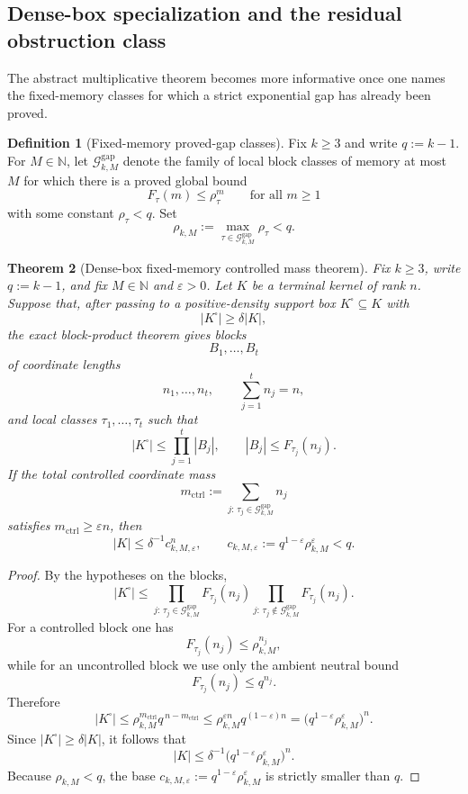 \documentclass[11pt]{article}
\newtheorem{theorem}{Theorem}[section]
\theoremstyle{definition}
\newtheorem{definition}[theorem]{Definition}
\newcommand{\eps}{\varepsilon}
\newcommand{\N}{\mathbb{N}}
\newcommand{\1}{\mathbf{1}}
\begin{document}
\subsection*{Dense-box specialization and the residual obstruction class}
The abstract multiplicative theorem becomes more informative once one names the fixed-memory classes for which a strict exponential gap has already been proved.

\begin{definition}[Fixed-memory proved-gap classes]\label{def:proved-gap-classes}
Fix $k\ge 3$ and write $q:=k-1$. For $M\in \N$, let $\mathcal G_{k,M}^{\mathrm{gap}}$ denote the family of local block classes of memory at most $M$ for which there is a proved global bound
\[
F_\tau(m)\le \rho_\tau^m
\qquad\text{for all }m\ge 1
\]
with some constant $\rho_\tau<q$. Set
\[
\rho_{k,M}:=\max_{\tau\in \mathcal G_{k,M}^{\mathrm{gap}}}\rho_\tau<q.
\]
\end{definition}

\begin{theorem}[Dense-box fixed-memory controlled mass theorem]\label{thm:dense-box-controlled-mass}
Fix $k\ge 3$, write $q:=k-1$, and fix $M\in \N$ and $\eps>0$. Let $K$ be a terminal kernel of rank $n$. Suppose that, after passing to a positive-density support box $K^\square\subseteq K$ with
\[
|K^\square|\ge \delta |K|,
\]
the exact block-product theorem gives blocks
\[
B_1,\dots,B_t
\]
of coordinate lengths
\[
n_1,\dots,n_t,
\qquad
\sum_{j=1}^t n_j=n,
\]
and local classes $\tau_1,\dots,\tau_t$ such that
\[
|K^\square|\le \prod_{j=1}^t |B_j|,
\qquad
|B_j|\le F_{\tau_j}(n_j).
\]
If the total controlled coordinate mass
\[
m_{\mathrm{ctrl}}:=\sum_{j:\,\tau_j\in \mathcal G_{k,M}^{\mathrm{gap}}} n_j
\]
satisfies $m_{\mathrm{ctrl}}\ge \eps n$, then
\[
|K|\le \delta^{-1} c_{k,M,\eps}^n,
\qquad
c_{k,M,\eps}:=q^{1-\eps}\rho_{k,M}^{\eps}<q.
\]
\end{theorem}

\begin{proof}
By the hypotheses on the blocks,
\[
|K^\square|
\le
\prod_{j:\,\tau_j\in \mathcal G_{k,M}^{\mathrm{gap}}} F_{\tau_j}(n_j)
\prod_{j:\,\tau_j\notin \mathcal G_{k,M}^{\mathrm{gap}}} F_{\tau_j}(n_j).
\]
For a controlled block one has
\[
F_{\tau_j}(n_j)\le \rho_{k,M}^{n_j},
\]
while for an uncontrolled block we use only the ambient neutral bound
\[
F_{\tau_j}(n_j)\le q^{n_j}.
\]
Therefore
\[
|K^\square|
\le
\rho_{k,M}^{m_{\mathrm{ctrl}}} q^{\,n-m_{\mathrm{ctrl}}}
\le
\rho_{k,M}^{\eps n} q^{(1-\eps)n}
=
\bigl(q^{1-\eps}\rho_{k,M}^{\eps}\bigr)^n.
\]
Since $|K^\square|\ge \delta |K|$, it follows that
\[
|K|\le \delta^{-1}\bigl(q^{1-\eps}\rho_{k,M}^{\eps}\bigr)^n.
\]
Because $\rho_{k,M}<q$, the base $c_{k,M,\eps}:=q^{1-\eps}\rho_{k,M}^{\eps}$ is strictly smaller than $q$.
\end{proof}
\end{document}
